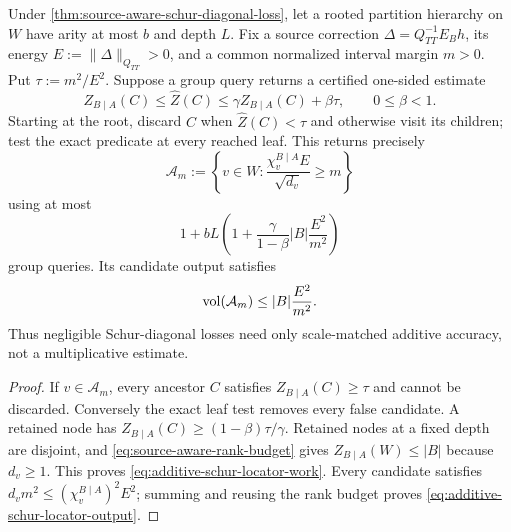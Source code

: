 \begin{corollary}
\label{cor:additive-schur-diagonal-locator}
Under \cref{thm:source-aware-schur-diagonal-loss}, let a rooted partition
hierarchy on $W$ have arity at most $b$ and depth $L$.  Fix a source
correction $\Delta=Q_{TT}^{-1}E_Bh$, its energy
$E:=\|\Delta\|_{Q_{TT}}>0$, and a common normalized interval margin $m>0$.
Put $\tau:=m^2/E^2$.  Suppose a group query returns a certified one-sided
estimate
\begin{equation}
 Z_{B\mid A}(C)\leq\widehat Z(C)
 \leq\gamma Z_{B\mid A}(C)+\beta\tau,
 \qquad 0\leq\beta<1.
 \label{eq:additive-schur-group-oracle}
\end{equation}
Starting at the root, discard $C$ when $\widehat Z(C)<\tau$ and otherwise
visit its children; test the exact predicate at every reached leaf.  This
returns precisely
\begin{equation*}
 \mathcal A_m
 :=\left\{v\in W:
   \frac{\chi_v^{B\mid A}E}{\sqrt{d_v}}\geq m
 \right\}
\end{equation*}
using at most
\begin{equation}
 1+bL\left(
  1+\frac{\gamma}{1-\beta}|B|\frac{E^2}{m^2}
 \right)
 \label{eq:additive-schur-locator-work}
\end{equation}
group queries.  Its candidate output satisfies
\begin{equation}
 \operatorname{vol}(\mathcal A_m)\leq |B|\frac{E^2}{m^2}.
 \label{eq:additive-schur-locator-output}
\end{equation}
Thus negligible Schur-diagonal losses need only scale-matched additive
accuracy, not a multiplicative estimate.
\end{corollary}

\begin{proof}
If $v\in\mathcal A_m$, every ancestor $C$ satisfies
$Z_{B\mid A}(C)\geq\tau$ and cannot be discarded.  Conversely the exact leaf
test removes every false candidate.  A retained node has
$Z_{B\mid A}(C)\geq(1-\beta)\tau/\gamma$.  Retained nodes at a fixed depth
are disjoint, and \cref{eq:source-aware-rank-budget} gives
$Z_{B\mid A}(W)\leq|B|$ because $d_v\geq1$.  This proves
\cref{eq:additive-schur-locator-work}.  Every candidate satisfies
$d_vm^2\leq(\chi_v^{B\mid A})^2E^2$; summing and reusing the rank budget proves
\cref{eq:additive-schur-locator-output}.
\end{proof}

